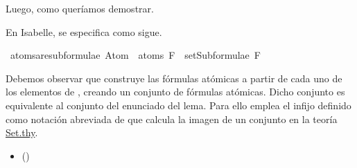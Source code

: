\begin{isabellebody}
\begin{isamarkuptext}
\begin{demostracion}
    Luego,  como queríamos demostrar.  
  \end{demostracion}

  En Isabelle, se especifica como sigue.%
\end{isamarkuptext}\isamarkuptrue%
\isamarkupfalse%
\ atoms{\isacharunderscore}are{\isacharunderscore}subformulae{\isacharcolon}\ {\isachardoublequoteopen}Atom\ {\isacharbackquote}\ atoms\ F\ {\isasymsubseteq}\ setSubformulae\ F{\isachardoublequoteclose}\isanewline
%
\isadelimproof
\ \ %
\endisadelimproof
%
\isatagproof
{}\isamarkupfalse%
%
\endisatagproof
{\isafoldproof}%
%
\isadelimproof
%
\endisadelimproof
%
\begin{isamarkuptext}%
Debemos observar que  construye las fórmulas 
  atómicas a partir de cada uno de los elementos de , creando 
  un conjunto de fórmulas atómicas. Dicho conjunto es equivalente al 
  conjunto  del enunciado del lema. Para ello emplea el infijo \isa{{\isacharbackquote}} 
  definido como notación abreviada de \isa{{\isacharparenleft}{\isacharbackquote}{\isacharparenright}} que calcula la 
  imagen de un conjunto en la teoría \href{https://n9.cl/qatp}{Set.thy}.

  \begin{itemize}
    \item[]  \hfill ()
  \end{itemize}


\end{isamarkuptext}
\end{isabellebody}

